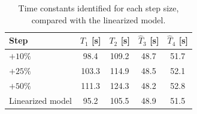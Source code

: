 \begin{table}[htbp]
    \centering
    \caption{Time constants identified for each step size, compared with the
    linearized model.}
    \label{tab:T_vs_step}
    \begin{tabular}{lcccc}
        \toprule
        Step & $T_1$ [s] & $T_2$ [s] & $\hat{T}_3$ [s] & $\hat{T}_4$ [s] \\
        \midrule
        $+10\%$          & 98.4  & 109.2 & 48.7 & 51.7 \\
        $+25\%$          & 103.3 & 114.9 & 48.5 & 52.1 \\
        $+50\%$          & 111.3 & 124.3 & 48.2 & 52.8 \\
        \midrule
        Linearized model & 95.2  & 105.5 & 48.9 & 51.5 \\
        \bottomrule
    \end{tabular}
\end{table}
